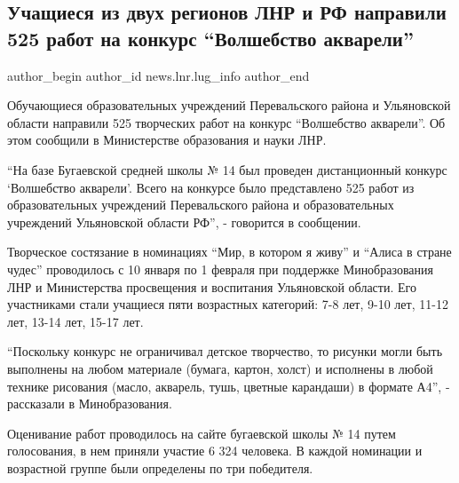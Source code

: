  
 
 
 
 
 
\subsection{Учащиеся из двух регионов ЛНР и РФ направили 525 работ на конкурс \enquote{Волшебство акварели}}
\label{sec:08_02_2022.stz.news.lnr.lug_info.1.konkurs_akvarel}
 
\ifcmt
 author_begin
   author_id news.lnr.lug_info
 author_end
\fi

Обучающиеся образовательных учреждений Перевальского района и Ульяновской
области направили 525 творческих работ на конкурс \enquote{Волшебство акварели}. Об
этом сообщили в Министерстве образования и науки ЛНР.


\enquote{На базе Бугаевской средней школы № 14 был проведен дистанционный конкурс
\enquote{Волшебство акварели}. Всего на конкурсе было представлено 525 работ из
образовательных учреждений Перевальского района и образовательных учреждений
Ульяновской области РФ}, - говорится в сообщении.


Творческое состязание в номинациях \enquote{Мир, в котором я живу} и \enquote{Алиса в стране
чудес} проводилось с 10 января по 1 февраля при поддержке Минобразования ЛНР и
Министерства просвещения и воспитания Ульяновской области. Его участниками
стали учащиеся пяти возрастных категорий: 7-8 лет, 9-10 лет, 11-12 лет, 13-14
лет, 15-17 лет.


\enquote{Поскольку конкурс не ограничивал детское творчество, то рисунки могли быть
выполнены на любом материале (бумага, картон, холст) и исполнены в любой
технике рисования (масло, акварель, тушь, цветные карандаши) в формате А4}, -
рассказали в Минобразования.


Оценивание работ проводилось на сайте бугаевской школы № 14 путем голосования,
в нем приняли участие 6 324 человека. В каждой номинации и возрастной группе
были определены по три победителя.
